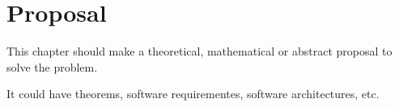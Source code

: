 \chapter{Proposal}
\label{chap:proposal}

This chapter should make a theoretical, mathematical or abstract proposal to solve the problem.

It could have theorems, software requirementes, software architectures, etc.